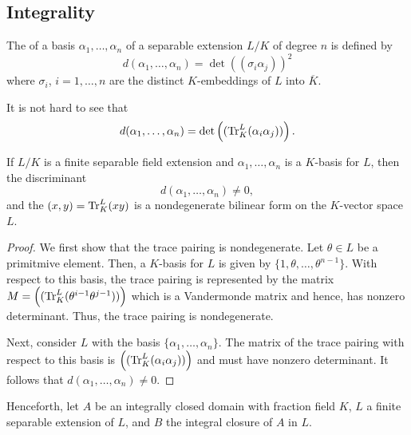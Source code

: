 \subsection{Integrality}

\begin{definition}
    The  of a basis $\alpha_1,\dots,\alpha_n$ of a separable extension $L/K$ of degree $n$ is defined by 
    \begin{equation*}
        d(\alpha_1,\dots,\alpha_n) = \det\left((\sigma_i\alpha_j)\right)^2
    \end{equation*}
    where $\sigma_i$, $i = 1,\dots, n$ are the distinct $K$-embeddings of $L$ into $\overline K$.
\end{definition}

It is not hard to see that 
\begin{equation*}
    d(\alpha_1,\dots,\alpha_n) = \det\left((\operatorname{Tr}^L_K(\alpha_i\alpha_j))\right).
\end{equation*}

\begin{proposition}
    If $L/K$ is a finite separable field extension and $\alpha_1,\dots,\alpha_n$ is a $K$-basis for $L$, then the discriminant 
    \begin{equation*}
        d(\alpha_1,\dots,\alpha_n)\ne 0,
    \end{equation*}
    and the  $(x, y) = \operatorname{Tr}^L_K(xy)$ is a nondegenerate bilinear form on the $K$-vector space $L$.
\end{proposition}
\begin{proof}
    We first show that the trace pairing is nondegenerate. Let $\theta\in L$ be a primitmive element. Then, a $K$-basis for $L$ is given by $\{1,\theta,\dots,\theta^{n - 1}\}$. With respect to this basis, the trace pairing is represented by the matrix $M = \left((\operatorname{Tr}^{L}_K(\theta^{i - 1}\theta^{j - 1}))\right)$ which is a Vandermonde matrix and hence, has nonzero determinant. Thus, the trace pairing is nondegenerate. 

    Next, consider $L$ with the basis $\{\alpha_1,\dots,\alpha_n\}$. The matrix of the trace pairing with respect to this basis is $\left((\operatorname{Tr}^{L}_K(\alpha_i\alpha_j))\right)$ and must have nonzero determinant. It follows that $d(\alpha_1,\dots,\alpha_n)\ne 0$.
\end{proof}

\begin{notation}
    Henceforth, let $A$ be an integrally closed domain with fraction field $K$, $L$ a finite separable extension of $L$, and $B$ the integral closure of $A$ in $L$.
\end{notation}

